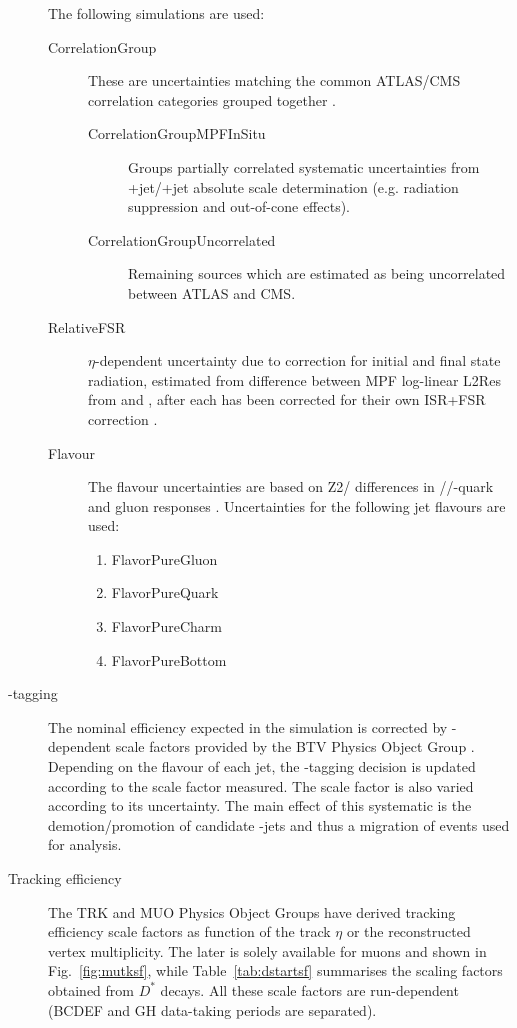 \begin{description}
The following simulations are used:
\begin{description}
        \item[CorrelationGroup]  These are uncertainties matching the common ATLAS/CMS correlation categories grouped together \cite{twiki:JESUS}. 
        \begin{description}                     
              \item[CorrelationGroupMPFInSitu] Groups partially correlated systematic uncertainties from \cPZ+jet/\cPgg+jet absolute scale determination (e.g. radiation suppression and out-of-cone effects).
              \item[CorrelationGroupUncorrelated] Remaining sources which are estimated as being uncorrelated between ATLAS and CMS.
        \end{description}
        \item[RelativeFSR] $\eta$-dependent uncertainty due to correction for initial and final state radiation, estimated from difference between MPF log-linear L2Res from  and \HERWIGpp, after each has been corrected for their own ISR+FSR correction \cite{Khachatryan:2016kdb}.
        \item[Flavour]  The flavour uncertainties are based on  Z2/ differences in \cPqu\cPqd\cPqs/\cPqc/\cPqb-quark and gluon responses \cite{Khachatryan:2016kdb}. Uncertainties for the following jet flavours are used:
        \begin{enumerate}
                \item FlavorPureGluon
                \item FlavorPureQuark
                \item FlavorPureCharm
                \item FlavorPureBottom
        \end{enumerate}
\end{description}

\item[\cPqb-tagging] The nominal efficiency expected in the simulation is corrected by \pt-dependent scale factors provided by the BTV Physics Object Group \cite{twiki:BTV}. Depending on the flavour of each jet, the \cPqb-tagging decision is updated according to the scale factor measured. The scale factor is also varied according to its uncertainty. The main effect of this systematic is the demotion/promotion of candidate \cPqb-jets and thus a migration of events used for analysis.

\item[Tracking efficiency]
The TRK and MUO Physics Object Groups have derived tracking efficiency scale factors as function of the track $\eta$ or the reconstructed vertex multiplicity. The later is solely available for muons and shown in Fig.~\ref{fig:mutksf}, while Table~\ref{tab:dstartsf} summarises the scaling factors obtained from $D^*$ decays. All these scale factors are run-dependent (BCDEF and GH data-taking periods are separated).


\end{description}
